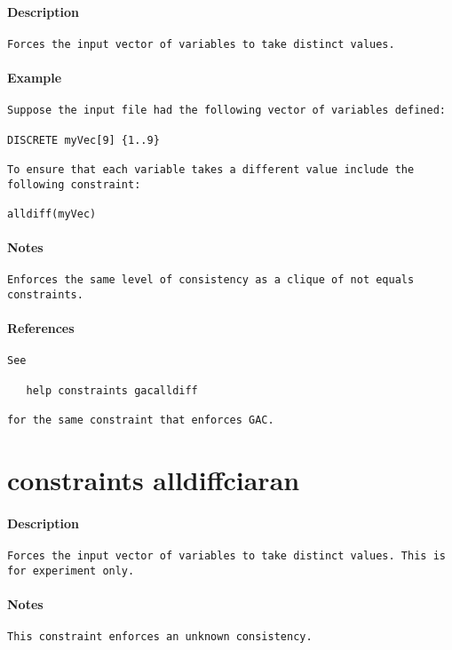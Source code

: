 \paragraph{Description}
{\footnotesize
\begin{verbatim}
Forces the input vector of variables to take distinct values.
\end{verbatim}
}
\paragraph{Example}
{\footnotesize
\begin{verbatim}
Suppose the input file had the following vector of variables defined:

DISCRETE myVec[9] {1..9}

To ensure that each variable takes a different value include the
following constraint:

alldiff(myVec)
\end{verbatim}
}
\paragraph{Notes}
{\footnotesize
\begin{verbatim}
Enforces the same level of consistency as a clique of not equals
constraints.
\end{verbatim}
}
\paragraph{References}
{\footnotesize
\begin{verbatim}
See

   help constraints gacalldiff

for the same constraint that enforces GAC.
\end{verbatim}
}
\section{constraints alldiffciaran}
\paragraph{Description}
{\footnotesize
\begin{verbatim}
Forces the input vector of variables to take distinct values. This is for experiment only. 
\end{verbatim}
}
\paragraph{Notes}
{\footnotesize
\begin{verbatim}
This constraint enforces an unknown consistency.
\end{verbatim}
}
